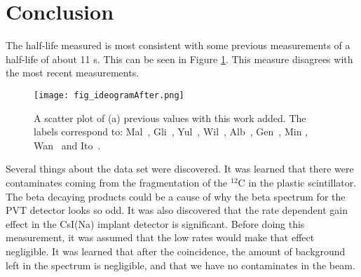 \section{Conclusion}
\label{sec:conclusion}

The half-life measured is most consistent with some previous measurements of a half-life of about 11 s. 
This can be seen in Figure \ref{fig:ideogramfinal}.
This measure disagrees with the most recent measurements.

\begin{figure}[!htb]
\centerline{\texttt{[image: fig\_ideogramAfter.png]}}
\caption{A scatter plot of (a) previous values with this work added.
	 The labels correspond to: Mal~\cite{Mal62}, Gli~\cite{Gli63},
	Yul~\cite{Yul67}, Wil~\cite{Wil70}, Alb~\cite{Alb75}, Gen~\cite{Gen76},
	Min \cite{Min87}, Wan~\cite{Wan92} and Ito~\cite{Ito95}.}
\label{fig:ideogramfinal}
\end{figure}

Several things about the data set were discovered.
It was learned that there were contaminates coming from the fragmentation of the $^{12}$C in the plastic scintillator.
The beta decaying products could be a cause of why the beta spectrum for the PVT detector looks so odd.
It was also discovered that the rate dependent gain effect in the CsI(Na) implant detector is significant.
Before doing this measurement, it was assumed that the low rates would make that effect negligible.
It was learned that after the coincidence, the amount of background left in the spectrum is negligible, and that we have no contaminates in the beam.



